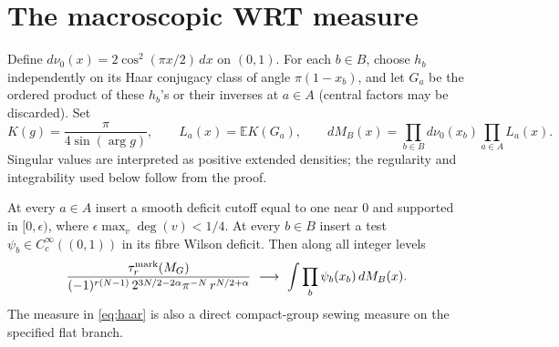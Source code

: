 \section{The macroscopic WRT measure}\label{sec:quantum}

Define \(d\nu_0(x)=2\cos^2(\pi x/2)\,dx\) on \((0,1)\). For each \(b\in B\), choose \(h_b\) independently on its Haar conjugacy class of angle \(\pi(1-x_b)\), and let \(G_a\) be the ordered product of these \(h_b\)'s or their inverses at \(a\in A\) (central factors may be discarded). Set
\begin{equation}\label{eq:haar}
 K(g)=\frac{\pi}{4\sin(\arg g)},\qquad L_a(x)=\mathbb E K(G_a),\qquad
 dM_B(x)=\prod_{b\in B}d\nu_0(x_b)\prod_{a\in A}L_a(x).
\end{equation}
Singular values are interpreted as positive extended densities; the regularity and integrability used below follow from the proof.

\begin{theorem}\label{thm:macro}
At every \(a\in A\) insert a smooth deficit cutoff equal to one near \(0\) and supported in \([0,\epsilon)\), where \(\epsilon\max_v\deg(v)<1/4\). At every \(b\in B\) insert a test \(\psi_b\in C_c^\infty((0,1))\) in its fibre Wilson deficit. Then along all integer levels
\[
 \frac{\tau_r^{\rm mark}(M_G)}
 {(-1)^{r(N-1)}\,2^{3N/2-2\alpha}\pi^{-N}\,r^{N/2+\alpha}}
 \ \longrightarrow\ \int\prod_b\psi_b(x_b)\,dM_B(x).
\]
The measure in \eqref{eq:haar} is also a direct compact-group sewing measure on the specified flat branch.
\end{theorem}

